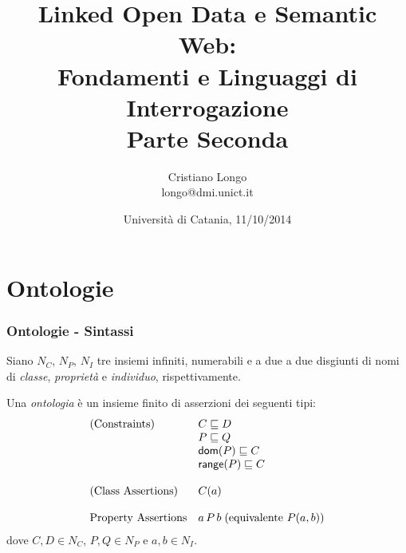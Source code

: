 \documentclass[8pt]{beamer}
\title{Linked Open Data e Semantic Web:\\
Fondamenti e Linguaggi di Interrogazione\\
Parte Seconda}
\author{Cristiano Longo\\ 
{\small{longo@dmi.unict.it}}}
\date{Universit\`a di Catania, 11/10/2014}
\begin{document}
\maketitle
\setcounter{tocdepth}{1}

\newcommand{\CNames}{N_C}
\newcommand{\PNames}{N_P}
\newcommand{\INames}{N_I}
\newcommand{\VNames}{V}
\newcommand{\DNames}{N_D}
\newcommand{\LNames}{N_L}
\newcommand{\BlankNodes}{\mathcal{B}}
\newcommand{\IRI}{IRI}


\newcommand{\Ont}{\mathcal{O}}
\newcommand{\Ontp}{\mathcal{O'}}

\newcommand{\datatypes}{\mathcal{D}}
\newcommand{\stringLiteral}[1]{\mbox{``#1''}}
\newcommand{\literal}[2]{\mbox{``#1''\textasciicircum\textasciicircum\url{#2}}} %
\newcommand{\literals}{\mathcal{L}}
\newcommand{\Vocab}{\mathcal{V}}

\section{Ontologie}

\begin{frame}
 \frametitle{Ontologie - Sintassi}

Siano $\CNames$, $\PNames$, $\INames$ tre insiemi infiniti, numerabili e 
a due a due disgiunti di nomi di \emph{classe}, \emph{propriet\`a} e \emph{individuo},
rispettivamente.
\vspace{\baselineskip}

Una \emph{ontologia} \`e un insieme finito di asserzioni dei seguenti tipi:
\[
 \begin{array}{ll}
  \mbox{(Constraints)} & C \sqsubseteq D\\
  & P \sqsubseteq Q \\
  & \mathsf{dom}(P) \sqsubseteq C \\
  & \mathsf{range}(P) \sqsubseteq C \\
  &\\
  \mbox{(Class Assertions)} & C(a)\\
  &\\
  \mbox{Property Assertions} & a\,P\,b\;(\mbox{equivalente }P(a,b))\\
 \end{array}
\]
dove $C, D \in \CNames$, $P, Q \in \PNames$ e $a, b \in \INames$.
\end{frame}
\end{document}
